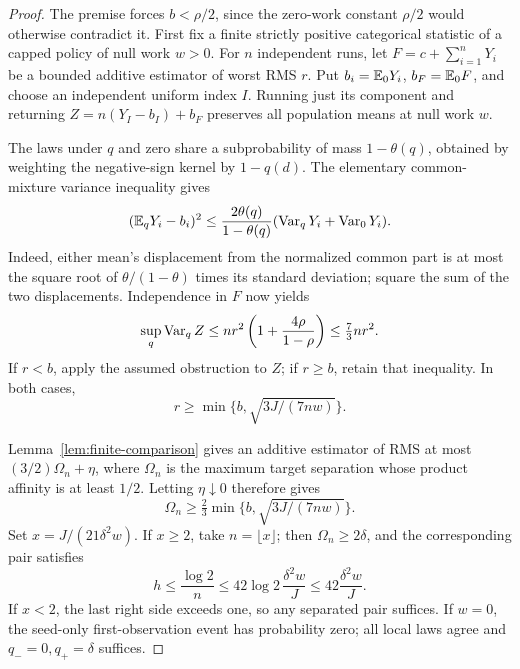 \begin{proof}
The premise forces \(b<\rho/2\), since the zero-work constant \(\rho/2\)
would otherwise contradict it.  First fix a finite strictly positive
categorical statistic of a capped policy of null work \(w>0\).
For \(n\) independent runs, let
\(F=c+\sum_{i=1}^nY_i\) be a bounded additive estimator of worst RMS
\(r\).  Put \(b_i=\mathbb E_0Y_i\), \(b_F=\mathbb E_0F\), and choose an independent
uniform index \(I\).  Running just its component and returning
\(Z=n(Y_I-b_I)+b_F\) preserves all population means at null work \(w\).

The laws under \(q\) and zero share a subprobability of mass
\(1-\theta(q)\), obtained by weighting the negative-sign kernel by
\(1-q(d)\).  The elementary common-mixture variance inequality gives
\[
 (\mathbb E_qY_i-b_i)^2\le
 \frac{2\theta(q)}{1-\theta(q)}
                 (\operatorname{Var}_qY_i+\operatorname{Var}_0Y_i).
\]
Indeed, either mean's displacement from the normalized common part is
at most the square root of \(\theta/(1-\theta)\) times its standard
deviation; square the sum of the two displacements.  Independence in
\(F\) now yields
\[
 \sup_q\operatorname{Var}_qZ\le
 nr^2\left(1+\frac{4\rho}{1-\rho}\right)\le\tfrac73nr^2.
\]
If \(r<b\), apply the assumed obstruction to \(Z\); if \(r\ge b\),
retain that inequality.  In both cases,
\[
 r\ge\min\{b,\sqrt{3J/(7nw)}\}.
\]

Lemma~\ref{lem:finite-comparison} gives an additive estimator of
RMS at most \((3/2)\Omega_n+\eta\), where \(\Omega_n\) is the maximum
target separation whose product affinity is at least \(1/2\).
Letting \(\eta\downarrow0\) therefore gives
\[
 \Omega_n\ge\tfrac23\min\{b,\sqrt{3J/(7nw)}\}.
\]
Set \(x=J/(21\delta^2w)\).  If \(x\ge2\), take
\(n=\lfloor x\rfloor\); then \(\Omega_n\ge2\delta\), and the
corresponding pair satisfies
\[
 h\le\frac{\log2}{n}
 \le42\log2\,\frac{\delta^2w}{J}
 \le42\frac{\delta^2w}{J}.
\]
If \(x<2\), the last right side exceeds one, so any separated pair
suffices.  If \(w=0\), the seed-only first-observation event has
probability zero; all local laws agree and \(q_-=0,q_+=\delta\)
suffices.


\end{proof}
